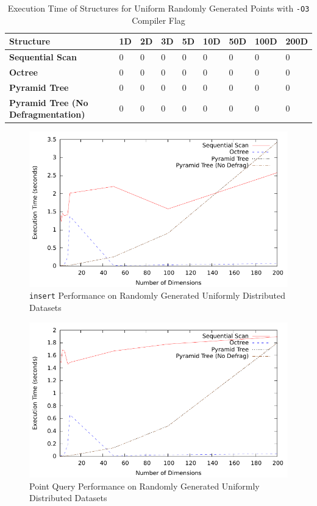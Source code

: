 \begin{table}
	\centering
	\begin{tabular}{|l|l|l|l|l|l|l|l|l|}
		\hline
		\textbf{Structure} & \textbf{1D} & \textbf{2D} & \textbf{3D} & \textbf{5D} & \textbf{10D} & \textbf{50D} & \textbf{100D} & \textbf{200D} \\
		\hline
		\textbf{Sequential Scan} & 0 & 0 & 0 & 0 & 0 & 0 & 0 & 0 \\
		\textbf{Octree} & 0 & 0 & 0 & 0 & 0 & 0 & 0 & 0 \\
		\textbf{Pyramid Tree} & 0 & 0 & 0 & 0 & 0 & 0 & 0 & 0 \\
		\textbf{Pyramid Tree (No Defragmentation)} & 0 & 0 & 0 & 0 & 0 & 0 & 0 & 0 \\
		\hline
	\end{tabular}
	\caption{Execution Time of Structures for Uniform Randomly Generated Points with \texttt{-O3} Compiler Flag}
	\label{tab:perf1-randuniform-o3}
\end{table}
\begin{figure}
	\centering
	\includegraphics[scale=0.8]{../results/end_of_iteration1/all_insert_randuniform.pdf}
	\caption{\texttt{insert} Performance on Randomly Generated Uniformly Distributed Datasets}
	\label{fig:perf-1-allinsert}
\end{figure}

\begin{figure}
	\centering
	\includegraphics[scale=0.8]{../results/end_of_iteration1/all_pquery_randuniform.pdf}
	\caption{Point Query Performance on Randomly Generated Uniformly Distributed Datasets}
	\label{fig:perf-1-allpquery}
\end{figure}

